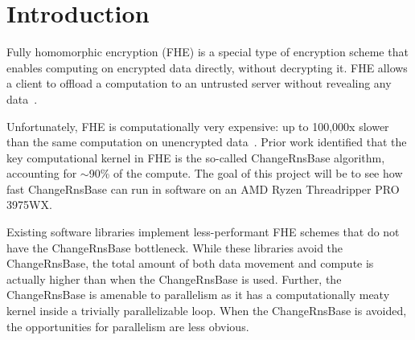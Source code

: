 \section{Introduction}\label{sec:introduction}

Fully homomorphic encryption (FHE) is a special type of encryption scheme that
enables computing on encrypted data directly, without decrypting it. FHE allows
a client to offload a computation to an untrusted server without revealing any
data~\cite{chen:ccs17:privset-fhe,DBLP:conf/tcc/GentryH19,gilad:icml16:cryptonets}.

Unfortunately, FHE is computationally very expensive: up to 100,000x slower
than the same computation on unencrypted data~\cite{halevi:crypto14:algorithms-helib}.
Prior work identified that the key computational kernel in FHE is the so-called
ChangeRnsBase algorithm, accounting for $\sim$90\% of the
compute\cite{samardzic:isca22:craterlake}.
The goal of this project will be to see how fast ChangeRnsBase can run in
software on an AMD Ryzen Threadripper PRO 3975WX.

Existing software libraries implement less-performant FHE schemes that do not
have the ChangeRnsBase bottleneck.
While these libraries avoid the
ChangeRnsBase, the total amount of both data movement and compute is actually
higher than when the ChangeRnsBase is used\cite{samardzic:isca22:craterlake}.
Further, the ChangeRnsBase is amenable to parallelism as it has a
computationally meaty kernel inside a trivially parallelizable loop.
When the ChangeRnsBase is avoided, the opportunities for parallelism are less
obvious.

